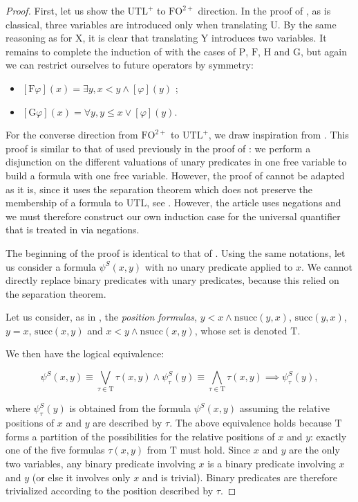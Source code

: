 \documentclass[a4paper,UKenglish,cleveref, autoref, thm-restate]{lipics-v2021}
\newcommand{\Tau}{\mathrm{T}}
\newcommand{\FO}{\mathrm{FO}}
\newcommand{\FOtwp}{\FO^{2+}}
\newcommand{\UTL}{\mathrm{UTL}}
\newcommand{\UTLp}{\UTL^+}
\newcommand{\X}{\mathrm{X}}
\newcommand{\Y}{\mathrm{Y}}
\newcommand{\U}{\mathrm{U}}
\renewcommand{\P}{\mathrm{P}}
\newcommand{\F}{\mathrm{F}}
\renewcommand{\H}{\mathrm{H}}
\newcommand{\G}{\mathrm{G}}
\renewcommand{\succ}{\mathrm{succ}}
\renewcommand{\nsucc}{\mathrm{nsucc}}
\begin{document}
\begin{proof}
    First, let us show the $\UTLp$ to $\FOtwp$ direction. In the proof of , as is classical, three variables are introduced only when translating $\U$. By the same reasoning as for $\X$, it is clear that translating $\Y$ introduces two variables. It remains to complete the induction of  with the cases of $\P$, $\F$, $\H$ and $\G$, but again we can restrict ourselves to future operators by symmetry:
    
    \begin{itemize}
        \item $[\F\varphi](x) = \exists y, x < y \land [\varphi](y)$ ;
        \item $[\G\varphi](x) = \forall y, y \leq x \lor [\varphi](y)$.
    \end{itemize}

    For the converse direction from $\FOtwp$ to $\UTLp$, we draw inspiration from \cite[Theorem 1]{UTL}. This proof is similar to that of \cite{FOtoLTL} used previously in the proof of : we perform a disjunction on the different valuations of unary predicates in one free variable to build a formula with one free variable. However, the proof of  cannot be adapted as it is, since it uses the separation theorem which does not preserve the membership of a formula to $\UTL$, see \cite[Lem 9.2.2]{tempLogicBook}. However, the article \cite{UTL} uses negations and we must therefore construct our own induction case for the universal quantifier that is treated in \cite{UTL} via negations.

    The beginning of the proof is identical to that of . Using the same notations, let us consider a formula $\psi^S(x,y)$ with no unary predicate applied to $x$. We cannot directly replace binary predicates with unary predicates, because this relied on the separation theorem.

    Let us consider, as in \cite{UTL}, the \emph{position formulas}, $y<x \land \nsucc(y,x)$, $\succ(y,x)$, $y=x$, $\succ(x,y)$ and $x < y \land \nsucc(x,y)$, whose set is denoted $\Tau$.


We then have the logical equivalence:


    $$
    \psi^S(x,y)
    \equiv \bigvee_{\tau \in \Tau} \tau(x,y) \land \psi_{\tau}^S(y)
    \equiv \bigwedge_{\tau \in \Tau} \tau(x,y) \implies \psi_{\tau}^S(y),
    $$

    where $\psi_{\tau}^S(y)$ is obtained from the formula $\psi^S(x,y)$ assuming the relative positions of $x$ and $y$ are described by $\tau$. The above equivalence holds because $\Tau$ forms a partition of the possibilities for the relative positions of $x$ and $y$: exactly one of the five formulas $\tau(x,y)$ from $\Tau$ must hold. Since $x$ and $y$ are the only two variables, any binary predicate involving $x$ is a binary predicate involving $x$ and $y$ (or else it involves only $x$ and is trivial). Binary predicates are therefore trivialized according to the position described by $\tau$.
    

\end{proof}
\end{document}
